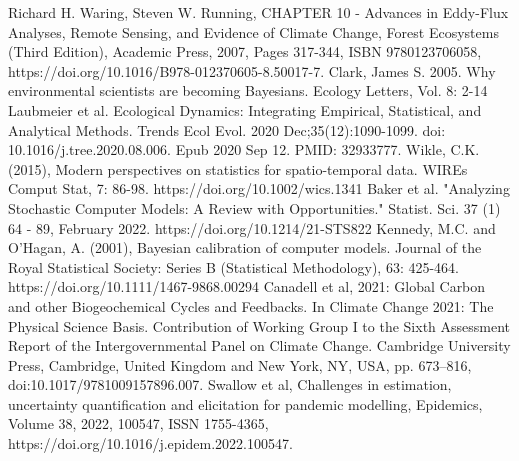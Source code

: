 \documentclass[12pt]{article}
\begin{document}
\begin{thebibliography}{20}
 Richard H. Waring, Steven W. Running, CHAPTER 10 - Advances in Eddy-Flux Analyses, Remote Sensing, and Evidence of Climate Change, Forest Ecosystems (Third Edition), Academic Press, 2007, Pages 317-344, ISBN 9780123706058, https://doi.org/10.1016/B978-012370605-8.50017-7.
 Clark, James S. 2005. Why environmental scientists are becoming Bayesians. Ecology Letters, Vol. 8: 2-14
 Laubmeier et al. Ecological Dynamics: Integrating Empirical, Statistical, and Analytical Methods. Trends Ecol Evol. 2020 Dec;35(12):1090-1099. doi: 10.1016/j.tree.2020.08.006. Epub 2020 Sep 12. PMID: 32933777.
 Wikle, C.K. (2015), Modern perspectives on statistics for spatio-temporal data. WIREs Comput Stat, 7: 86-98. https://doi.org/10.1002/wics.1341
 Baker et al. "Analyzing Stochastic Computer Models: A Review with Opportunities." Statist. Sci. 37 (1) 64 - 89, February 2022. https://doi.org/10.1214/21-STS822
 Kennedy, M.C. and O'Hagan, A. (2001), Bayesian calibration of computer models. Journal of the Royal Statistical Society: Series B (Statistical Methodology), 63: 425-464. https://doi.org/10.1111/1467-9868.00294
 Canadell et al, 2021: Global Carbon and
other Biogeochemical Cycles and Feedbacks. In Climate Change 2021: The Physical Science Basis. Contribution of
Working Group I to the Sixth Assessment Report of the Intergovernmental Panel on Climate Change. Cambridge University Press,
Cambridge, United Kingdom and New York, NY, USA, pp. 673–816, doi:10.1017/9781009157896.007.
 Swallow et al, Challenges in estimation, uncertainty quantification and elicitation for pandemic modelling, Epidemics, Volume 38, 2022, 100547, ISSN 1755-4365, https://doi.org/10.1016/j.epidem.2022.100547.
\end{thebibliography}
\end{document}
